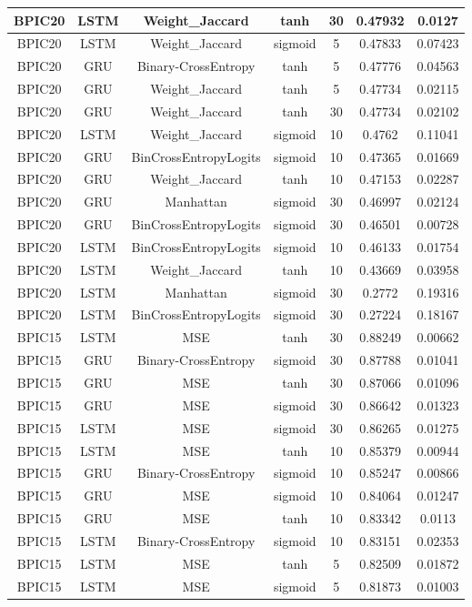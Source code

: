 \documentclass{article}%
\begin{document}
\begin{longtable}{|c|c|c|c|c|c|c|}
\hline%
BPIC20&LSTM&Weight\_Jaccard&tanh&30&0.47932&0.0127\\%
\hline%
BPIC20&LSTM&Weight\_Jaccard&sigmoid&5&0.47833&0.07423\\%
\hline%
BPIC20&GRU&Binary{-}CrossEntropy&tanh&5&0.47776&0.04563\\%
\hline%
BPIC20&GRU&Weight\_Jaccard&tanh&5&0.47734&0.02115\\%
\hline%
BPIC20&GRU&Weight\_Jaccard&tanh&30&0.47734&0.02102\\%
\hline%
BPIC20&LSTM&Weight\_Jaccard&sigmoid&10&0.4762&0.11041\\%
\hline%
BPIC20&GRU&BinCrossEntropyLogits&sigmoid&10&0.47365&0.01669\\%
\hline%
BPIC20&GRU&Weight\_Jaccard&tanh&10&0.47153&0.02287\\%
\hline%
BPIC20&GRU&Manhattan&sigmoid&30&0.46997&0.02124\\%
\hline%
BPIC20&GRU&BinCrossEntropyLogits&sigmoid&30&0.46501&0.00728\\%
\hline%
BPIC20&LSTM&BinCrossEntropyLogits&sigmoid&10&0.46133&0.01754\\%
\hline%
BPIC20&LSTM&Weight\_Jaccard&tanh&10&0.43669&0.03958\\%
\hline%
BPIC20&LSTM&Manhattan&sigmoid&30&0.2772&0.19316\\%
\hline%
BPIC20&LSTM&BinCrossEntropyLogits&sigmoid&30&0.27224&0.18167\\%
\hline%
BPIC15&LSTM&MSE&tanh&30&0.88249&0.00662\\%
\hline%
BPIC15&GRU&Binary{-}CrossEntropy&sigmoid&30&0.87788&0.01041\\%
\hline%
BPIC15&GRU&MSE&tanh&30&0.87066&0.01096\\%
\hline%
BPIC15&GRU&MSE&sigmoid&30&0.86642&0.01323\\%
\hline%
BPIC15&LSTM&MSE&sigmoid&30&0.86265&0.01275\\%
\hline%
BPIC15&LSTM&MSE&tanh&10&0.85379&0.00944\\%
\hline%
BPIC15&GRU&Binary{-}CrossEntropy&sigmoid&10&0.85247&0.00866\\%
\hline%
BPIC15&GRU&MSE&sigmoid&10&0.84064&0.01247\\%
\hline%
BPIC15&GRU&MSE&tanh&10&0.83342&0.0113\\%
\hline%
BPIC15&LSTM&Binary{-}CrossEntropy&sigmoid&10&0.83151&0.02353\\%
\hline%
BPIC15&LSTM&MSE&tanh&5&0.82509&0.01872\\%
\hline%
BPIC15&LSTM&MSE&sigmoid&5&0.81873&0.01003\\%

\end{longtable}
\end{document}

